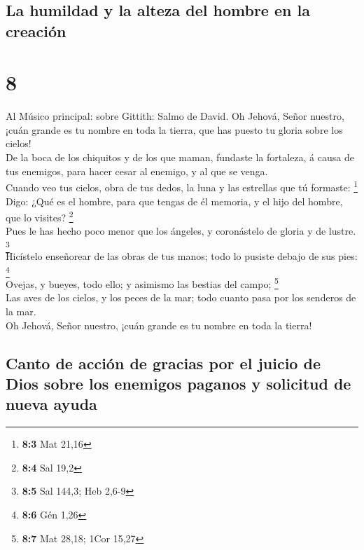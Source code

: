 \hypertarget{la-humildad-y-la-alteza-del-hombre-en-la-creaciuxf3n}{%
\subsection{La humildad y la alteza del hombre en la
creación}\label{la-humildad-y-la-alteza-del-hombre-en-la-creaciuxf3n}}

\hypertarget{section-7}{%
\section{8}\label{section-7}}

 Al Músico principal: sobre Gittith: Salmo de David. Oh
Jehová, Señor nuestro, ¡cuán grande es tu nombre en toda la tierra, que
has puesto tu gloria sobre los cielos!\\
 De la boca de los chiquitos y de los que maman, fundaste la
fortaleza, á causa de tus enemigos, para hacer cesar al enemigo, y al
que se venga.\\
 Cuando veo tus cielos, obra de tus dedos, la luna y las
estrellas que tú formaste: \footnote{\textbf{8:3} Mat 21,16}\\
 Digo: ¿Qué es el hombre, para que tengas de él memoria, y
el hijo del hombre, que lo visites? \footnote{\textbf{8:4} Sal 19,2}\\
 Pues le has hecho poco menor que los ángeles, y coronástelo
de gloria y de lustre. \footnote{\textbf{8:5} Sal 144,3; Heb 2,6-9}\\
 Hicístelo enseñorear de las obras de tus manos; todo lo
pusiste debajo de sus pies: \footnote{\textbf{8:6} Gén 1,26}\\
 Ovejas, y bueyes, todo ello; y asimismo las bestias del
campo; \footnote{\textbf{8:7} Mat 28,18; 1Cor 15,27}\\
 Las aves de los cielos, y los peces de la mar; todo cuanto
pasa por los senderos de la mar.\\
 Oh Jehová, Señor nuestro, ¡cuán grande es tu nombre en toda
la tierra!

\hypertarget{canto-de-acciuxf3n-de-gracias-por-el-juicio-de-dios-sobre-los-enemigos-paganos-y-solicitud-de-nueva-ayuda}{%
\subsection{Canto de acción de gracias por el juicio de Dios sobre los
enemigos paganos y solicitud de nueva
ayuda}\label{canto-de-acciuxf3n-de-gracias-por-el-juicio-de-dios-sobre-los-enemigos-paganos-y-solicitud-de-nueva-ayuda}}

